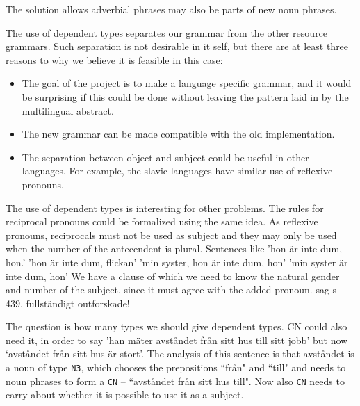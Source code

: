 \documentclass{report}
\begin{document}
The solution allows adverbial phrases may also be parts of new noun phrases.

The use of dependent types separates our grammar from the other resource grammars. Such separation
is not desirable in it self, but there are at least three reasons to why we believe it is feasible in this case:
\begin{itemize}
\item The goal of the project is to make a language specific grammar, and it would be surprising if this could be
      done without leaving the pattern laid in by the multilingual abstract.
\item The new grammar can be made compatible with the old implementation.
\item The separation between object and subject could be useful in other languages. For example, the slavic languages
      have similar use of reflexive pronouns.
\end{itemize}

The use of dependent types is interesting for other problems.
The rules for reciprocal pronouns could be formalized using the same idea. As reflexive pronouns, reciprocals
must not be used as subject and they may only be used when the number of the antecendent is plural.
Sentences like
'hon är inte dum, hon.' 'hon är inte dum, flickan' 'min syster, hon är inte dum, hon'
'min syster är inte dum, hon'
We have a clause of which we need to know the natural gender and number of the subject, since it
must agree with the added pronoun. sag s 439. fullständigt outforskade!

The question is how many types we should give dependent types. CN could also need it,
in order to say
'han mäter avståndet från sitt hus till sitt jobb' but now `avståndet från sitt hus är stort'.
The analysis of this sentence is that
avståndet is a noun of type \verb-N3-, which chooses the prepositions ``från" and ``till"
and needs to noun phrases to form a \verb-CN- -- ``avståndet från sitt hus till".
Now also \verb-CN- needs to carry about whether it is possible to use it as a subject.
\end{document}
